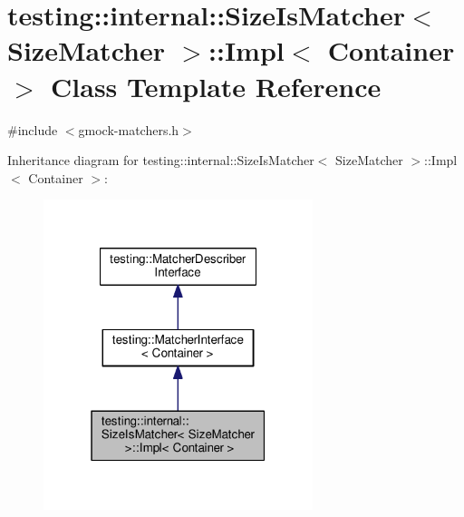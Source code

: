 \hypertarget{classtesting_1_1internal_1_1SizeIsMatcher_1_1Impl}{}\section{testing\+:\+:internal\+:\+:Size\+Is\+Matcher$<$ Size\+Matcher $>$\+:\+:Impl$<$ Container $>$ Class Template Reference}
\label{classtesting_1_1internal_1_1SizeIsMatcher_1_1Impl}


{\ttfamily \#include $<$gmock-\/matchers.\+h$>$}



Inheritance diagram for testing\+:\+:internal\+:\+:Size\+Is\+Matcher$<$ Size\+Matcher $>$\+:\+:Impl$<$ Container $>$\+:
\nopagebreak
\begin{figure}[H]
\begin{center}
\leavevmode
\includegraphics[width=223pt]{classtesting_1_1internal_1_1SizeIsMatcher_1_1Impl__inherit__graph}
\end{center}
\end{figure}



